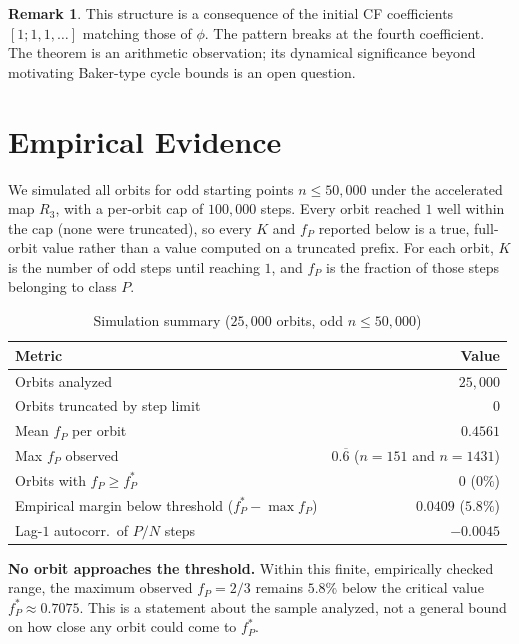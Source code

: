 \documentclass[12pt,reqno]{amsart}
\theoremstyle{plain}
\theoremstyle{definition}
\newtheorem{remark}[theorem]{Remark}
\newcommand{\fP}{f_P}
\newcommand{\fPstar}{f_P^*}
\begin{document}
\begin{remark}
This structure is a consequence of the initial CF coefficients $[1;1,1,\dots]$
matching those of $\phi$. The pattern breaks at the fourth coefficient.
The theorem is an arithmetic observation; its dynamical significance beyond
motivating Baker-type cycle bounds is an open question.
\end{remark}

\section{Empirical Evidence}\label{sec:empirical}

We simulated all orbits for odd starting points $n \leq 50{,}000$ under the
accelerated map $R_3$, with a per-orbit cap of $100{,}000$ steps. Every orbit
reached $1$ well within the cap (none were truncated), so every $K$ and $\fP$
reported below is a true, full-orbit value rather than a value computed on a
truncated prefix. For each orbit, $K$ is the number of odd steps until
reaching $1$, and $\fP$ is the fraction of those steps belonging to class $P$.

\begin{table}[ht]
\centering
\caption{Simulation summary ($25{,}000$ orbits, odd $n \leq 50{,}000$)}
\label{tab:simulation}
\begin{tabular}{@{}lr@{}}
\toprule
Metric & Value \\
\midrule
Orbits analyzed & $25{,}000$ \\
Orbits truncated by step limit & $0$ \\
Mean $\fP$ per orbit & $0.4561$ \\
Max $\fP$ observed & $0.\overline{6}$ ($n = 151$ and $n = 1431$) \\
Orbits with $\fP \geq \fPstar$ & $0$ ($0\%$) \\
Empirical margin below threshold ($\fPstar - \max \fP$) & $0.0409$ ($5.8\%$) \\
Lag-$1$ autocorr.~of $P/N$ steps & $-0.0045$ \\
\bottomrule
\end{tabular}
\end{table}

\textbf{No orbit approaches the threshold.} Within this finite, empirically
checked range, the maximum observed $\fP = 2/3$ remains $5.8\%$ below the
critical value $\fPstar \approx 0.7075$. This is a statement about the sample
analyzed, not a general bound on how close any orbit could come to $\fPstar$.
\end{document}
